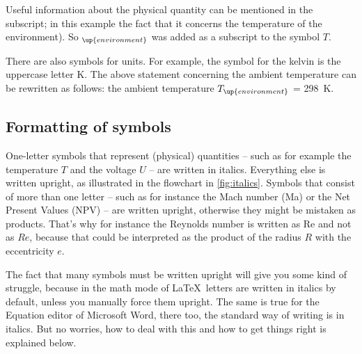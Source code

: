 Useful information about the physical quantity can be mentioned in the subscript; in this example the fact that it concerns the temperature of the environment). So $_\up{environment}$ was added as a subscript to the symbol $T$.

There are also symbols for units. For example, the symbol for the kelvin is the uppercase letter K. The above statement concerning the ambient temperature can be rewritten as follows: the ambient temperature $T_\up{environment}$ = \qty{298}{\kelvin}.

\subsection{Formatting of symbols}
One-letter symbols that represent (physical) quantities -- such as for example the temperature $T$ and the voltage $U$ -- are written in italics. Everything else is written upright, as illustrated in the flowchart in \cref{fig:italics}.  Symbols that consist of more than one letter -- such as for instance the Mach number (Ma) or the Net Present Values (NPV) -- are written upright, otherwise they might be mistaken as products. That's why for instance the Reynolds number is written as Re and not as $Re$, because that could be interpreted as the product of the radius $R$ with the eccentricity $e$.

The fact that many symbols must be written upright will give you some kind of struggle, because in the math mode of \LaTeX\, letters are written in italics by default, unless you manually force them upright. The same is true for the Equation editor of Microsoft Word, there too, the standard way of writing is in italics. But no worries, how to deal with this and how to get things right is explained below.

